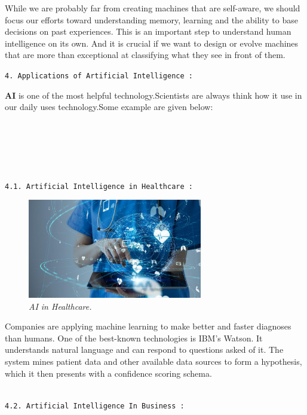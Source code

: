 \documentclass{article}
\begin{document}
While we are probably far from creating machines that are self-aware, we should focus our efforts toward understanding memory, learning and the ability to base decisions on past experiences. This is an important step to understand human intelligence on its own. And it is crucial if we want to design or evolve machines that are more than exceptional at classifying what they see in front of them.\\[3cm]

\begin{large}
\texttt{4. Applications of Artificial Intelligence :}\\
\end{large}

\textbf{\Huge AI} is one of the most helpful technology.Scientists are always think how it use in our daily uses technology.Some example are given below:\\\\\\\\\\\

\begin{large}
\texttt{4.1. Artificial Intelligence in Healthcare :}
\end{large}

\begin{figure}

\centering
\includegraphics[width=3in]{AI Health}
\caption{\textit{AI in Healthcare.}}
\end{figure}

Companies are applying machine learning to make better and faster diagnoses than humans. One of the best-known technologies is IBM’s Watson. It understands natural language and can respond to questions asked of it. The system mines patient data and other available data sources to form a hypothesis, which it then presents with a confidence scoring schema.\\\\

\begin{large}
\texttt{4.2. Artificial Intelligence In Business :}
\end{large}
\end{document}
